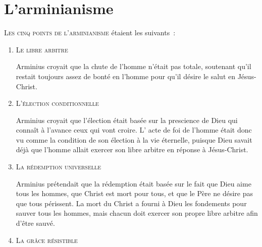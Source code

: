 \section{L'arminianisme}

\lettrine[findent=-0.2em,lraise=0.15]{L}{es \og cinq points de l'arminianisme \fg{}} étaient les suivants~:\\[.5ex]

\begin{enumerate}
  \item  \textsc{Le libre arbitre}

\nobreak
Arminius croyait que la chute de l'homme
  n'était pas totale,
 soutenant qu'il restait toujours assez de bonté en l'homme
 pour qu'il désire le salut en Jésus-Christ.

  \item  \textsc{L'élection conditionnelle}

\nobreak
Arminius croyait que l'élection était basée sur la prescience
 de Dieu qui connaît à l'avance ceux qui vont croire.
 L' \og acte de foi \fg de l'homme était donc vu comme la \og condition \fg{} 
 de son élection à la vie éternelle, puisque Dieu savait déjà
 que l'homme allait exercer son \og libre arbitre \fg{}
 en réponse à Jésus-Christ.

  \item  \textsc{La rédemption universelle}

\nobreak
Arminius prétendait que la rédemption était basée sur le fait
 que Dieu aime tous les hommes, que Christ est mort pour tous,
 et que le Père ne désire pas que tous périssent.
 La mort du Christ a fourni à Dieu les fondements
 pour sauver tous les hommes, mais chacun doit exercer son propre
 \og libre arbitre \fg{} afin d'être sauvé.

  \item  \textsc{La grâce résistible}


\end{enumerate}

